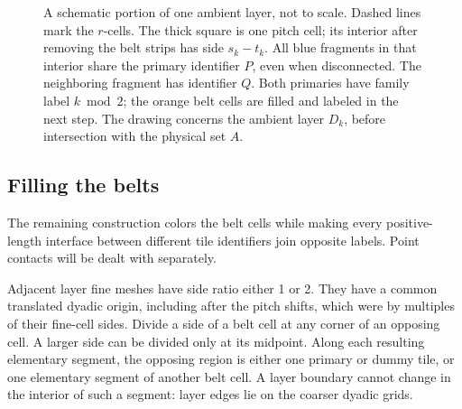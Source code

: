 \begin{figure}[H]
\centering
{}
\caption{A schematic portion of one ambient layer, not to scale.
Dashed lines mark the $r$-cells.  The thick square is one pitch cell;
its interior after removing the belt strips has side $s_k-t_k$.
All blue fragments in that interior share the primary identifier $P$,
even when disconnected.  The neighboring fragment has identifier $Q$.
Both primaries have family label $k\bmod2$; the orange belt cells are
filled and labeled in the next step.  The drawing concerns the ambient
layer $D_k$, before intersection with the physical set $A$.}
\label{geometry:layer-picture}
\end{figure}

\subsection{Filling the belts}

The remaining construction colors the belt cells while making every
positive-length interface between different tile identifiers join
opposite labels.  Point contacts will be dealt with separately.

Adjacent layer fine meshes have side ratio either 1 or 2.  They have a
common translated dyadic origin, including after the pitch shifts, which
were by multiples of their fine-cell sides.  Divide a side of a belt
cell at any corner of an opposing cell.  A larger side can be divided
only at its midpoint.  Along each resulting elementary segment, the
opposing region is either one primary or dummy tile, or one elementary
segment of another belt cell.  A layer boundary cannot change in the
interior of such a segment: layer edges lie on the coarser dyadic grids.


